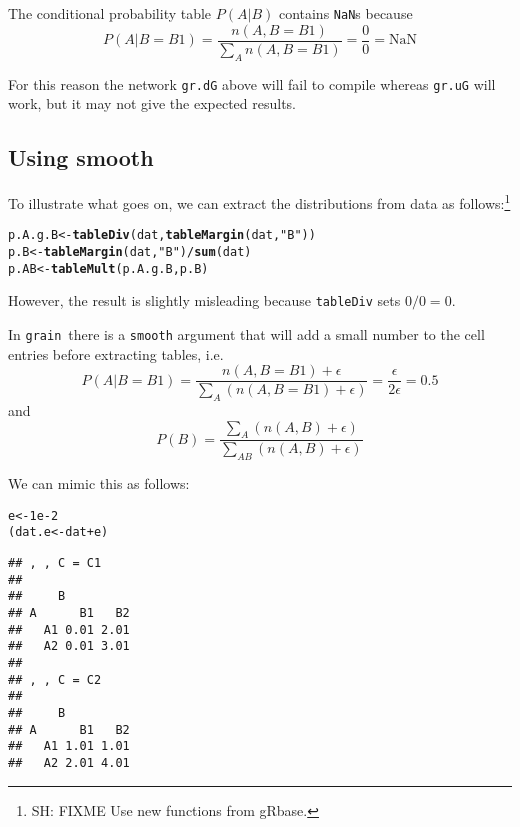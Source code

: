 \documentclass[10pt]{article}\usepackage[]{graphicx}\usepackage[]{color}
\makeatletter
\newcommand{\hlnum}[1]{\textcolor[rgb]{0.686,0.059,0.569}{#1}}%
\newcommand{\hlstr}[1]{\textcolor[rgb]{0.192,0.494,0.8}{#1}}%
\newcommand{\hlopt}[1]{\textcolor[rgb]{0,0,0}{#1}}%
\newcommand{\hlstd}[1]{\textcolor[rgb]{0.345,0.345,0.345}{#1}}%
\newcommand{\hlkwb}[1]{\textcolor[rgb]{0.69,0.353,0.396}{#1}}%
\newcommand{\hlkwd}[1]{\textcolor[rgb]{0.737,0.353,0.396}{\textbf{#1}}}%
\newenvironment{kframe}{%
 \def\at@end@of@kframe{}%
 \ifinner\ifhmode%
  \def\at@end@of@kframe{\end{minipage}}%
  \begin{minipage}{\columnwidth}%
 \fi\fi%
 \def\FrameCommand##1{\hskip\@totalleftmargin \hskip-\fboxsep
 \colorbox{shadecolor}{##1}\hskip-\fboxsep
     \hskip-\linewidth \hskip-\@totalleftmargin \hskip\columnwidth}%
 \MakeFramed {\advance\hsize-\width
   \@totalleftmargin\z@ \linewidth\hsize
   \@setminipage}}%
 {\par\unskip\endMakeFramed%
 \at@end@of@kframe}
\newenvironment{knitrout}{}{} %
\def\grain{\texttt{grain}}
\def\code#1{{\texttt{#1}}}
\makeatother
\begin{document}
The conditional probability table $P(A|B)$ contains \code{NaN}s
because
\begin{displaymath}
  P(A|B=B1)=\frac{n(A,B=B1)}{\sum_A n(A,B=B1)} = \frac{0}{0} = \mbox{NaN}
\end{displaymath}

For this reason the network \code{gr.dG} above will fail to compile
whereas \code{gr.uG} will work, but it may not give the expected results.

\subsection{Using smooth}
\label{sec:using-smooth}

To illustrate what goes on, we can extract the distributions from data
as follows:\footnote{SH: FIXME Use new functions from gRbase.}

\begin{knitrout}
\color{fgcolor}\begin{kframe}
\begin{alltt}
\hlstd{p.A.g.B} \hlkwb{<-} \hlkwd{tableDiv}\hlstd{(dat,} \hlkwd{tableMargin}\hlstd{(dat,} \hlstr{"B"}\hlstd{))}
\hlstd{p.B}     \hlkwb{<-} \hlkwd{tableMargin}\hlstd{(dat,} \hlstr{"B"}\hlstd{)} \hlopt{/} \hlkwd{sum}\hlstd{(dat)}
\hlstd{p.AB}    \hlkwb{<-} \hlkwd{tableMult}\hlstd{( p.A.g.B, p.B)}
\end{alltt}
\end{kframe}
\end{knitrout}

However, the result is slightly misleading because \code{tableDiv}
sets $0/0=0$.

In \grain\ there is a \code{smooth} argument that will add a small
number to the cell entries before extracting tables, i.e.
\begin{displaymath}
  P(A|B=B1)=\frac{n(A,B=B1)+\epsilon}{\sum_A ( n(A,B=B1) + \epsilon) }
  = \frac{\epsilon}{2\epsilon} = 0.5
\end{displaymath}
and
\begin{displaymath}
  P(B)= \frac{\sum_A (n(A,B)+\epsilon)}{\sum_{AB} (n(A,B)+\epsilon)}
\end{displaymath}

We can mimic this as follows:
\begin{knitrout}
\color{fgcolor}\begin{kframe}
\begin{alltt}
\hlstd{e} \hlkwb{<-} \hlnum{1e-2}
\hlstd{(dat.e} \hlkwb{<-} \hlstd{dat} \hlopt{+} \hlstd{e)}
\end{alltt}
\begin{verbatim}
## , , C = C1
## 
##     B
## A      B1   B2
##   A1 0.01 2.01
##   A2 0.01 3.01
## 
## , , C = C2
## 
##     B
## A      B1   B2
##   A1 1.01 1.01
##   A2 2.01 4.01
\end{verbatim}
\end{kframe}
\end{knitrout}
\end{document}
